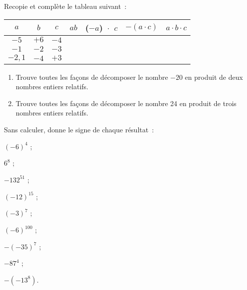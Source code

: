 \begin{exercice}
Recopie et complète le tableau suivant :
{\small
\begin{center}
\begin{tabular}{|c|c|c|c|c|c|c|}
\hline
\cellcolor{H2} $a$ & \cellcolor{H2} $b$ & \cellcolor{H2} $c$ & \cellcolor{A2} $ab$ &  \cellcolor{A2} ($-a$) $\cdot$ $c$ &  \cellcolor{A2} $-(a\cdot c)$ &  \cellcolor{A2} $a \cdot b \cdot c$ \\\hline 
\cellcolor{H3} $-5$ & \cellcolor{H3} $+6$ & \cellcolor{H3} $-4$ & \cellcolor{A3} & \cellcolor{A3} & \cellcolor{A3} & \cellcolor{A3} \\\hline
\cellcolor{H3} $-1$ & \cellcolor{H3} $-2$ & \cellcolor{H3} $-3$ & \cellcolor{A3} & \cellcolor{A3} & \cellcolor{A3} & \cellcolor{A3} \\\hline
\cellcolor{H3} $-2,1$ & \cellcolor{H3} $-4$ & \cellcolor{H3} $+3$ & \cellcolor{A3} & \cellcolor{A3} & \cellcolor{A3} & \cellcolor{A3} \\\hline
 \end{tabular}
 \end{center}
 } %
\end{exercice}


\begin{exercice}
\begin{enumerate}
 \item Trouve toutes les façons de décomposer le nombre $-20$ en produit de deux nombres entiers relatifs.
 \item Trouve toutes les façons de décomposer le nombre 24 en produit de trois nombres entiers relatifs.
 \end{enumerate}
\end{exercice}


\begin{exercice}
Sans calculer, donne le signe de chaque résultat :
\begin{colenumerate}{3}
 \item $(-6)^{4}$ ;
 \item $6^{8}$ ;
 \item $-132^{51}$ ;
 \item $(-12)^{15}$ ;
 \item $(-3)^{7}$ ;
 \item $(-6)^{100}$ ;
 \item $-(-35)^{7}$ ;
 \item $-87^{4}$ ;
 \item $-(-13^{8})$.
 \end{colenumerate}
\end{exercice}


